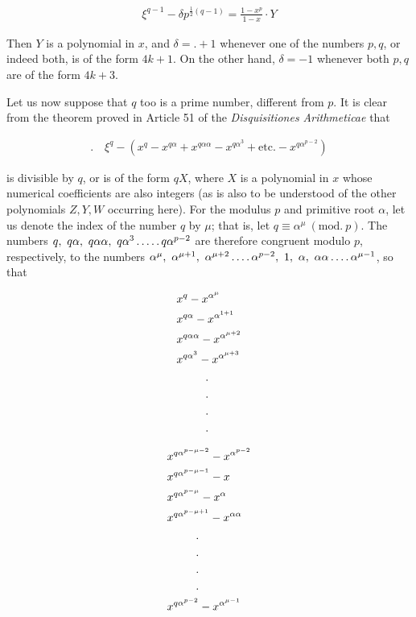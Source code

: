 \[
\begin{aligned}
\xi^{q-1}-\delta p^{\frac12(q-1)}=\frac{1-x^p}{1-x}\cdot Y
\end{aligned}
\]

Then $Y$ is a polynomial in $x$, and $\delta=\mathord{.}+1$ whenever one of the numbers $p,q$, or indeed both, is of the form $4k+1$. On the other hand, $\delta=-1$ whenever both $p,q$ are of the form $4k+3$.

\newpage
{}

Let us now suppose that $q$ too is a prime number, different from $p$. It is clear from the theorem proved in Article 51 of the \textit{Disquisitiones Arithmeticae} that

\[
\begin{aligned}
\mathord{.}\quad\xi^q-(x^q-x^{q\alpha}+x^{q\alpha\alpha}-x^{q\alpha^3}+\text{etc.}-x^{q\alpha^{p-2}})
\end{aligned}
\]

is divisible by $q$, or is of the form $qX$, where $X$ is a polynomial in $x$ whose numerical coefficients are also integers (as is also to be understood of the other polynomials $Z,Y,W$ occurring here). For the modulus $p$ and primitive root $\alpha$, let us denote the index of the number $q$ by $\mu$; that is, let $q\equiv\alpha^\mu\ (\mathrm{mod.}\ p)$. The numbers $q,\ q\alpha,\ q\alpha\alpha,\ q\alpha^3\dotsfive q\alpha^{p-2}$ are therefore congruent modulo $p$, respectively, to the numbers $\alpha^\mu,\allowbreak\ \alpha^{\mu+1},\allowbreak\ \alpha^{\mu+2}\dotsfour\alpha^{p-2},\allowbreak\ 1,\allowbreak\ \alpha,\allowbreak\ \alpha\alpha\dotsfour\alpha^{\mu-1}$, so that

\[
\begin{aligned}
&x^q-x^{\alpha^\mu}\\
&x^{q\alpha}-x^{\alpha^{1+1}}\\
&x^{q\alpha\alpha}-x^{\alpha^{\mu+2}}\\
&x^{q\alpha^3}-x^{\alpha^{\mu+3}}\\
&\hspace{9mm}\begin{gathered}.\\.\\.\\.\end{gathered}
\end{aligned}
\]

\[
\begin{aligned}
&x^{q\alpha^{p-\mu-2}}-x^{\alpha^{p-2}}\\
&x^{q\alpha^{p-\mu-1}}-x\\
&x^{q\alpha^{p-\mu}}-x^\alpha\\
&x^{q\alpha^{p-\mu+1}}-x^{\alpha\alpha}\\
&\hspace{9mm}\begin{gathered}.\\.\\.\\.\end{gathered}\\
&x^{q\alpha^{p-2}}-x^{\alpha^{\mu-1}}
\end{aligned}
\]


